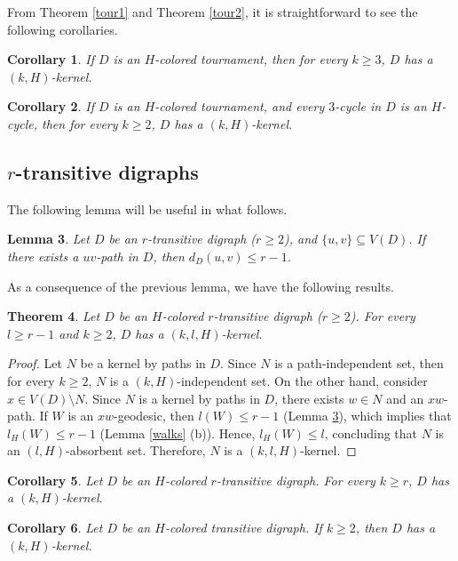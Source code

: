 \documentclass[10pt,a4paper]{article}
\newtheorem{theorem}{Theorem}[section]
\newtheorem{lemma}[theorem]{Lemma}
\newtheorem{cor}[theorem]{Corollary}
\begin{document}
From Theorem \ref{tour1} and Theorem \ref{tour2}, it is straightforward to see the following corollaries. 

\begin{cor}
If $D$ is an $H$-colored tournament, then for every $k \geq 3$, $D$ has a $(k,H)$-kernel.
\end{cor}

\begin{cor}
If $D$ is an $H$-colored tournament, and every $3$-cycle in $D$ is an $H$-cycle, then for every $k \geq 2$, $D$ has a $(k,H)$-kernel.
\end{cor}


\subsection{$r$-transitive digraphs}

The following lemma will be useful in what follows.

\begin{lemma}\cite{3qt}
\label{ktrans}
Let $D$ be an $r$-transitive digraph ($r \geq 2$), and $\{u, v \} \subseteq V(D)$. If there exists a $uv$-path in $D$, then $d_{D}(u,v) \leq r-1$.
\end{lemma}

As a consequence of the previous lemma, we have the following results.

\begin{theorem}
Let $D$ be an $H$-colored $r$-transitive digraph ($r \geq 2$). For every $l \geq r-1$ and $k \geq 2$, $D$ has a $(k, l, H)$-kernel.
\end{theorem}
\begin{proof}
Let $N$ be a kernel by paths in $D$. Since $N$ is a path-independent set, then for every $k \geq 2$, $N$ is a $(k,H)$-independent set. On the other hand, consider $x \in V(D) \setminus N$. Since $N$ is a kernel by paths in $D$, there exists $w \in N$ and an $xw$-path. If $W$ is an $xw$-geodesic, then $l(W) \leq r-1$ (Lemma \ref{ktrans}), which implies that $l_{H}(W) \leq r-1$ (Lemma \ref{walks} (b)). Hence, $l_{H}(W) \leq l$, concluding that $N$ is an $(l,H)$-absorbent set. Therefore, $N$ is a $(k,l,H)$-kernel. 
\end{proof}

\begin{cor}
\label{panrtrans}
Let $D$ be an $H$-colored $r$-transitive digraph. For every $k \geq r$, $D$ has a $(k,H)$-kernel.
\end{cor}

\begin{cor}
\label{pantrans}
Let $D$ be an $H$-colored transitive digraph. If $k \geq 2$, then $D$ has a $(k,H)$-kernel.
\end{cor}
\end{document}
